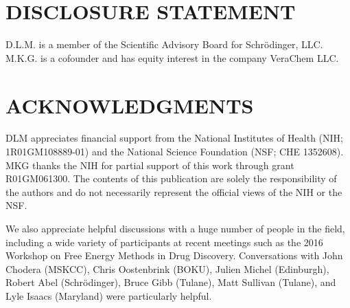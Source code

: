 \documentclass[aps,pre,twocolumn,nofootinbib,superscriptaddress,10pt, final,tightenlines]{revtex4-1}
\begin{document}
\section*{DISCLOSURE STATEMENT}
D.L.M. is a member of the Scientific Advisory Board for Schr\"{o}dinger, LLC. M.K.G. is a cofounder and has equity interest in the company VeraChem LLC.

\section*{ACKNOWLEDGMENTS}
DLM appreciates financial support from the National Institutes of Health (NIH; 1R01GM108889-01) and the National Science Foundation  (NSF; CHE 1352608). MKG thanks the NIH for partial support of this work through grant R01GM061300. The contents of this publication are solely the responsibility of the authors and do not necessarily represent the official views of the NIH or the NSF. 

We also appreciate helpful discussions with a huge number of people in the field, including a wide variety of participants at recent meetings such as the 2016 Workshop on Free Energy Methods in Drug Discovery.
Conversations with John Chodera (MSKCC), Chris Oostenbrink (BOKU), Julien Michel (Edinburgh), Robert Abel (Schr\"{o}dinger), Bruce Gibb (Tulane), Matt Sullivan (Tulane), and Lyle Isaacs (Maryland) were particularly helpful.

\listoftodos




\end{document}
